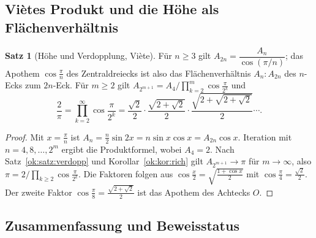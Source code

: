\documentclass[a4paper,12pt,twoside]{report}
\theoremstyle{definition}
\newtheorem{satz}{Satz}
\begin{document}
\subsection{Viètes Produkt und die Höhe als Flächenverhältnis}
\label{sec:ok:viete}

\begin{satz}[Höhe und Verdopplung, Viète]\label{ok:satz:viete}
Für $n\ge3$ gilt $A_{2n}=\dfrac{A_n}{\cos(\pi/n)}$; das Apothem $\cos\frac\pi n$ des Zentraldreiecks ist also das Flächenverhältnis $A_n:A_{2n}$ des $n$-Ecks zum $2n$-Eck. Für $m\ge2$ gilt $A_{2^{m+1}}=A_4\big/\prod_{k=2}^m\cos\frac\pi{2^k}$ und
\[
\frac2\pi=\prod_{k=2}^\infty\cos\frac\pi{2^k}=\frac{\sqrt2}2\cdot\frac{\sqrt{2+\sqrt2}}2\cdot\frac{\sqrt{2+\sqrt{2+\sqrt2}}}2\cdots .
\]
\end{satz}

\begin{proof}
Mit $x=\frac\pi n$ ist $A_n=\frac n2\sin2x=n\sin x\cos x=A_{2n}\cos x$. Iteration mit $n=4,8,\dots,2^m$ ergibt die Produktformel, wobei $A_4=2$. Nach Satz~\ref{ok:satz:verdopp} und Korollar~\ref{ok:kor:rich} gilt $A_{2^{m+1}}\to\pi$ für $m\to\infty$, also $\pi=2/\prod_{k\ge2}\cos\frac\pi{2^k}$. Die Faktoren folgen aus $\cos\frac x2=\sqrt{\frac{1+\cos x}2}$ mit $\cos\frac\pi4=\frac{\sqrt2}2$. Der zweite Faktor $\cos\frac\pi8=\frac{\sqrt{2+\sqrt2}}2$ ist das Apothem des Achtecks $O$.
\end{proof}

\subsection{Zusammenfassung und Beweisstatus}
\label{sec:ok:ergebnis}
\end{document}
